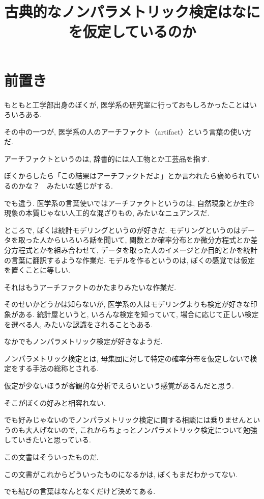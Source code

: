 \documentclass[12pt]{jsarticle}
\title{古典的なノンパラメトリック検定はなにを仮定しているのか}
\author{}
\begin{document}
\maketitle
\section{前置き}

もともと工学部出身のぼくが, 医学系の研究室に行っておもしろかったことはいろいろある. 

その中の一つが, 医学系の人のアーチファクト（artifact）という言葉の使い方だ. 

アーチファクトというのは, 辞書的には人工物とか工芸品を指す.

ぼくからしたら「この結果はアーチファクトだよ」とか言われたら褒められているのかな？　みたいな感じがする.

でも違う. 医学系の言葉使いではアーチファクトというのは, 自然現象とか生命現象の本質じゃない人工的な混ざりもの, みたいなニュアンスだ.

ところで, ぼくは統計モデリングというのが好きだ. モデリングというのはデータを取った人からいろいろ話を聞いて, 関数とか確率分布とか微分方程式とか差分方程式とかを組み合わせて, データを取った人のイメージとか目的とかを統計の言葉に翻訳するような作業だ. モデルを作るというのは, ぼくの感覚では仮定を置くことに等しい. 

それはもうアーチファクトのかたまりみたいな作業だ.

そのせいかどうかは知らないが, 医学系の人はモデリングよりも検定が好きな印象がある. 統計屋というと, いろんな検定を知っていて, 場合に応じて正しい検定を選べる人, みたいな認識をされることもある.

なかでもノンパラメトリック検定が好きなようだ. 

ノンパラメトリック検定とは, 母集団に対して特定の確率分布を仮定しないで検定をする手法の総称とされる. 

仮定が少ないほうが客観的な分析でえらいという感覚があるんだと思う.

そこがぼくの好みと相容れない. 

でも好みじゃないのでノンパラメトリック検定に関する相談には乗りませんというのも大人げないので, これからちょっとノンパラメトリック検定について勉強していきたいと思っている.

この文書はそういったものだ. 

この文書がこれからどういったものになるかは, ぼくもまだわかってない.

でも結びの言葉はなんとなくだけど決めてある. 
\end{document}
